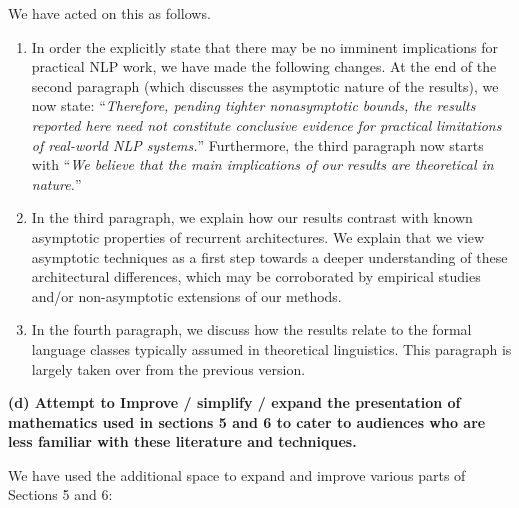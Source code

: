 \documentclass[11pt,a4paper]{article}
\newcommand\response[1]{{\color{blue}#1}}
\newcommand\newtext[1]{``\textit{#1}''}
\newcommand\original[1]{\textbf{#1}}
\begin{document}
\response{We have acted on this as follows.}
\begin{enumerate}
    \item \response{In order the explicitly state that there may be no imminent implications for practical NLP work, we have made the following changes. At the end of the second paragraph (which discusses the asymptotic nature of the results), we now state: \newtext{Therefore, pending tighter nonasymptotic bounds, the results reported here need not constitute conclusive evidence for practical limitations of real-world NLP systems.} Furthermore, the third paragraph now starts with \newtext{We  believe  that  the  main  implications  of  our results  are  theoretical  in  nature.}}

\item \response{In the third paragraph, we  explain how our results contrast with known asymptotic properties of recurrent architectures. We explain that we view asymptotic techniques as a first step towards a deeper understanding of these architectural differences, which may be corroborated by empirical studies and/or non-asymptotic extensions of our methods.}

\item \response{In the fourth paragraph, we discuss how the results relate to the formal language classes typically assumed in theoretical linguistics. This paragraph is largely taken over from the previous version.}

\end{enumerate}

\original{(d) Attempt to Improve / simplify / expand the presentation of mathematics
used in sections 5 and 6 to cater to audiences who are less familiar with
these literature and techniques.}

\response{We have used the additional space to expand and improve various parts of Sections 5 and 6:}
\end{document}
